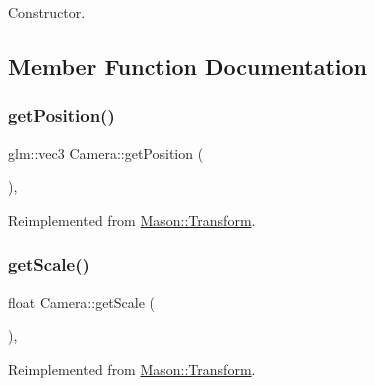 Constructor. 



\subsection{Member Function Documentation}
\hypertarget{class_mason_1_1_camera_a71560b8b6216a542ae1958bd91a4361d}{}\label{class_mason_1_1_camera_a71560b8b6216a542ae1958bd91a4361d} 
\subsubsection{\texorpdfstring{get\+Position()}{getPosition()}}
{\footnotesize\ttfamily glm\+::vec3 Camera\+::get\+Position (\begin{DoxyParamCaption}{ }\end{DoxyParamCaption})\hspace{0.3cm}{\ttfamily [override]}, {\ttfamily [virtual]}}



Reimplemented from \hyperlink{class_mason_1_1_transform_a0b21f641e72d7b55f3a630b986d0b106}{Mason\+::\+Transform}.

\hypertarget{class_mason_1_1_camera_a9c86fd4a182c472001f5d52e99fc0bbc}{}\label{class_mason_1_1_camera_a9c86fd4a182c472001f5d52e99fc0bbc} 
\subsubsection{\texorpdfstring{get\+Scale()}{getScale()}}
{\footnotesize\ttfamily float Camera\+::get\+Scale (\begin{DoxyParamCaption}{ }\end{DoxyParamCaption})\hspace{0.3cm}{\ttfamily [override]}, {\ttfamily [virtual]}}



Reimplemented from \hyperlink{class_mason_1_1_transform_afb5f0dbe6bcd49e26a792f578bf5ec9d}{Mason\+::\+Transform}.

\hypertarget{class_mason_1_1_camera_abe43550148e85f5a32919a3c8b8ff115}{}\label{class_mason_1_1_camera_abe43550148e85f5a32919a3c8b8ff115} 
